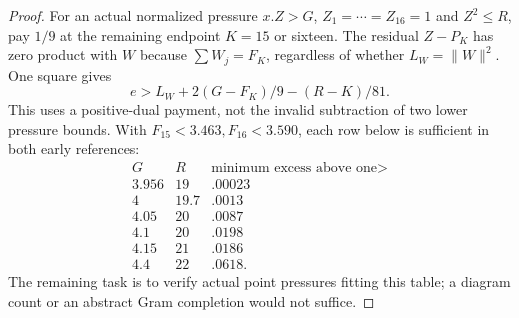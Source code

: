 \documentclass[11pt]{article}
\theoremstyle{definition}
\theoremstyle{remark}
\newcommand{\norm}[1]{\lVert #1\rVert}
\begin{document}
\begin{proof}
For an actual normalized pressure $x.Z>G$, $Z_1=\cdots=Z_{16}=1$
and $Z^2\le R$, pay $1/9$ at the remaining endpoint $K=15$ or
sixteen. The residual $Z-P_K$ has zero product with $W$ because
$\sum W_j=F_K$, regardless of whether $L_W=\norm W^2$. One square gives
\[
 e>L_W+2(G-F_K)/9-(R-K)/81.
\]
This uses a positive-dual payment, not the invalid subtraction of two
lower pressure bounds. With $F_{15}<3.463,F_{16}<3.590$, each row
below is sufficient in both early references:
\[
\begin{array}{c|c|c}
G&R&\text{minimum excess above one}>\\\hline
3.956&19&.00023\\4&19.7&.0013\\4.05&20&.0087\\
4.1&20&.0198\\4.15&21&.0186\\4.4&22&.0618 .
\end{array}
\]
The remaining task is to verify actual point pressures fitting this
table; a diagram count or an abstract Gram completion would not suffice.
\end{proof}
\end{document}
